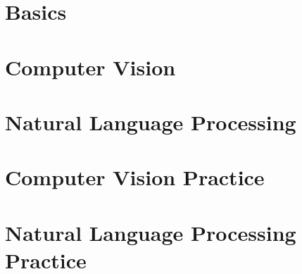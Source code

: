 \documentclass[a4paper,10pt]{book}
\begin{document}
\frontmatter{}

\cleardoublepage{}
\tableofcontents{}
\cleardoublepage{}
\listoffigures{}
\cleardoublepage{}
\listoftables{}


\mainmatter{}

\part{Basics}
\label{part:basics}







\part{Computer Vision}
\label{part:build-mach-learn}



\part{Natural Language Processing}
\label{part:natur-lang-proc-1}





\part{Computer Vision Practice}
\label{part:comp-visi-pract}






\part{Natural Language Processing Practice}
\label{part:natur-lang-proc}





\backmatter{}
\cleardoublepage{}
\nocite{*}


\cleardoublepage{}
\printindex{}
\end{document}
